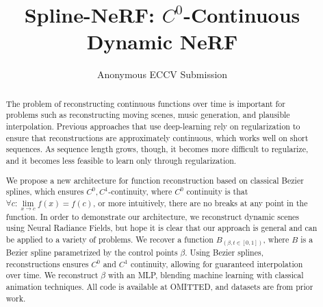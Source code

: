 \documentclass[runningheads]{llncs}
\begin{document}
\pagestyle{headings}
\mainmatter
\def\ECCVSubNumber{TODO}

\title{Spline-NeRF: $C^0$-Continuous Dynamic NeRF}
\author{Anonymous ECCV Submission}
\institute{Paper ID \ECCVSubNumber}

\maketitle

\begin{abstract}
The problem of reconstructing continuous functions over time is important for problems such as reconstructing moving scenes, music generation, and plausible interpolation.
Previous approaches that use deep-learning rely on regularization to ensure that reconstructions are approximately continuous, which works well on short sequences. As sequence length grows, though, it becomes more difficult to regularize, and it becomes less feasible to learn only through regularization.

We propose a new architecture for function reconstruction based on classical Bezier splines, which ensures $C^0, C^1$-continuity, where $C^0$ continuity is that $\forall c:\lim\limits_{x\to c} f(x) = f(c)$, or more intuitively, there are no breaks at any point in the function. In order to demonstrate our architecture, we reconstruct dynamic scenes using Neural Radiance Fields, but hope it is clear that our approach is general and can be applied to a variety of problems. We recover a function $B_(\beta, t\in[0,1])$, where $B$ is a Bezier spline
parametrized by the control points $\beta$. Using Bezier splines, reconstructions ensures $C^0$ and $C^1$ continuity, allowing for guaranteed interpolation over time. We reconstruct $\beta$ with an MLP, blending machine learning with classical animation techniques. All code is available at
OMITTED, and datasets are from prior work.

\end{abstract}
\end{document}
